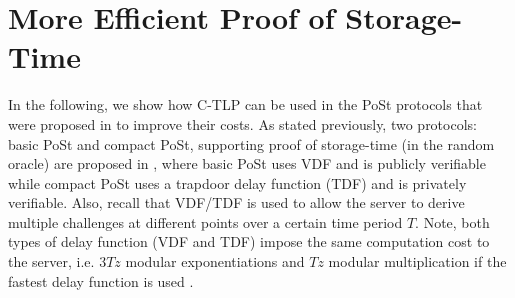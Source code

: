 

%
%


\section{More Efficient Proof of Storage-Time}\label{More-Efficient-Proof-of-Storage-Time}

In the following, we show how C-TLP can be used in the PoSt protocols that were proposed in  \cite{Storage-Time} to improve their costs. As stated previously,  two protocols: basic PoSt and compact PoSt, supporting proof of storage-time (in the random oracle) are proposed in \cite{Storage-Time}, where  basic PoSt uses VDF and is publicly verifiable while compact PoSt  uses a trapdoor delay function (TDF) and is privately verifiable. Also, recall that VDF/TDF is used to allow the server to derive multiple challenges at different points over a certain time period $T$. Note, both types of delay function (VDF and TDF) impose the same computation cost to the server, i.e. $3Tz$ modular exponentiations and $Tz$ modular multiplication if the fastest delay function is used \cite{Wesolowski19}. 

